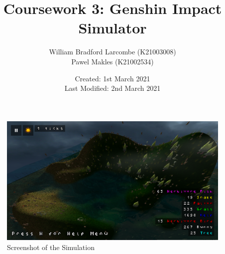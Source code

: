 \documentclass{article}
\title{\Huge Coursework 3: Genshin Impact Simulator}
\author{William Bradford Larcombe \small (K21003008) \\ Pawel Makles \small (K21002534)}
\date{\small Created: 1st March 2021 \\ Last Modified: 2nd March 2021}
\begin{document}
    \maketitle
    \begin{figure}[h]
        \centering
        \includegraphics[width=\textwidth]{../screenshot.png}
        \caption{Screenshot of the Simulation}
    \end{figure}
    
    \newpage
\end{document}

